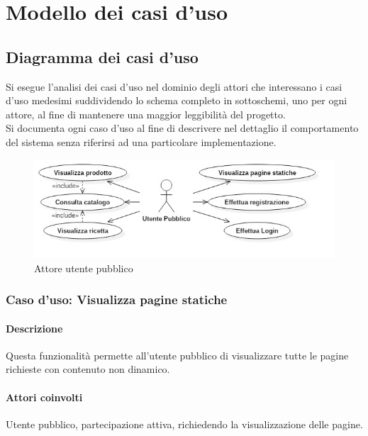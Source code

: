 
\chapter{Modello dei casi d'uso}
\label{cap:modello-casi-d'uso}

\section{Diagramma dei casi d'uso}
Si esegue l'analisi dei casi d'uso nel dominio degli attori che interessano i casi d'uso medesimi suddividendo lo schema completo in sottoschemi, uno per ogni attore, al fine di mantenere una maggior leggibilità del progetto. \\
Si documenta ogni caso d'uso al fine di descrivere nel dettaglio il comportamento del sistema senza riferirsi ad una particolare implementazione.

\begin{figure}[h]
	\centering
	\includegraphics[width=1\textwidth]
	{immagini/01_utente_pubblico}
	
	\caption{Attore utente pubblico}
\end{figure}

%
%
\subsection{Caso d'uso: Visualizza pagine statiche}

	\subsubsection*{Descrizione}
	Questa funzionalità permette all'utente pubblico di visualizzare tutte le pagine richieste con contenuto non dinamico.
	
	\subsubsection*{Attori coinvolti}
	Utente pubblico, partecipazione attiva, richiedendo la visualizzazione delle pagine.
	
